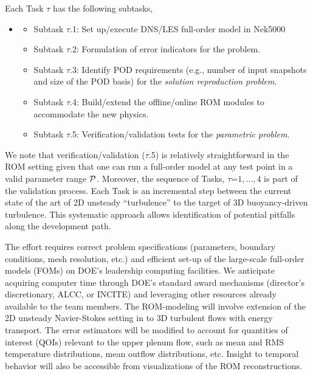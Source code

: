 {Each Task $\tau$ has the following subtasks, \\[-4ex]
\begin{itemize}
\item %
   \begin{itemize}
     \item Subtask $\tau$.1: Set up/execute DNS/LES full-order model in Nek5000
\\[-3.6ex]
     \item Subtask $\tau$.2: Formulation of error indicators for the problem.
\\[-3.6ex]
     \item Subtask $\tau$.3: Identify POD requirements (e.g., number of input
                       snapshots and size of the POD basis) for the
                       {\em solution reproduction problem}.
\\[-3.6ex]
     \item Subtask $\tau$.4: Build/extend the offline/online ROM 
                       modules to accommodate the new physics.
\\[-3.6ex]
     \item Subtask $\tau$.5: Verification/validation tests for the {\em parametric problem}. \\[-4ex]
   \end{itemize}
\end{itemize}
We note that verification/validation ($\tau$.5) is relatively straightforward in
the ROM setting given that one can run a full-order model at any test point in
a valid parameter range $\mathcal{P}$.  Moreover, the sequence of Tasks,
$\tau$=$1,\dots,4$ is part of the validation process.  Each Task is an incremental
step between the current state of the art of 2D unsteady ``turbulence'' to the
target of 3D buoyancy-driven turbulence.  This systematic approach allows 
identification of potential pitfalls along the development path.

The effort requires correct problem specifications (parameters, boundary
conditions, mesh resolution, etc.) and efficient set-up of the large-scale
full-order models (FOMs) on DOE's leadership computing facilities.  We
anticipate acquiring computer time through DOE's standard award mechanisms
(director's discretionary, ALCC, or INCITE) and leveraging other resources
already available to the team members.  The ROM-modeling will involve extension
of the 2D unsteady Navier-Stokes setting in \cite{fick18} to 3D turbulent flows
with energy transport.  The error estimators will be modified to account for
quantities of interest (QOIs) relevant to the upper plenum flow, such as mean
and RMS temperature distributions, mean outflow distributions, etc.
Insight to temporal behavior will also be accessible from visualizations
of the ROM reconstructions.

}
